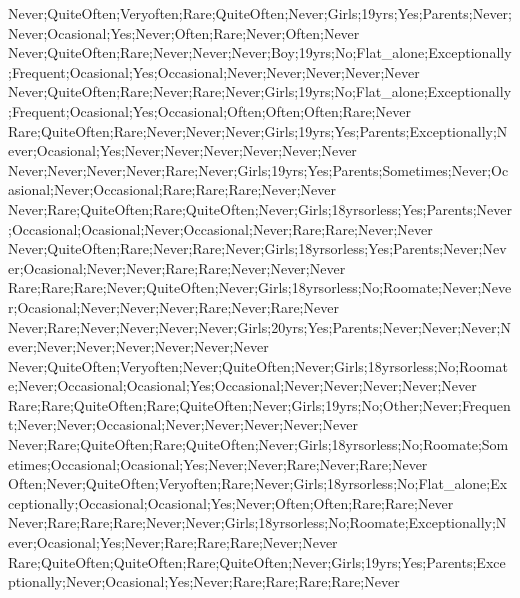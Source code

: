 Never;QuiteOften;Veryoften;Rare;QuiteOften;Never;Girls;19yrs;Yes;Parents;Never;Never;Ocasional;Yes;Never;Often;Rare;Never;Often;Never
Never;QuiteOften;Rare;Never;Never;Never;Boy;19yrs;No;Flat_alone;Exceptionally;Frequent;Ocasional;Yes;Occasional;Never;Never;Never;Never;Never
Never;QuiteOften;Rare;Never;Rare;Never;Girls;19yrs;No;Flat_alone;Exceptionally;Frequent;Ocasional;Yes;Occasional;Often;Often;Often;Rare;Never
Rare;QuiteOften;Rare;Never;Never;Never;Girls;19yrs;Yes;Parents;Exceptionally;Never;Ocasional;Yes;Never;Never;Never;Never;Never;Never
Never;Never;Never;Never;Rare;Never;Girls;19yrs;Yes;Parents;Sometimes;Never;Ocasional;Never;Occasional;Rare;Rare;Rare;Never;Never
Never;Rare;QuiteOften;Rare;QuiteOften;Never;Girls;18yrsorless;Yes;Parents;Never;Occasional;Ocasional;Never;Occasional;Never;Rare;Rare;Never;Never
Never;QuiteOften;Rare;Never;Rare;Never;Girls;18yrsorless;Yes;Parents;Never;Never;Ocasional;Never;Never;Rare;Rare;Never;Never;Never
Rare;Rare;Rare;Never;QuiteOften;Never;Girls;18yrsorless;No;Roomate;Never;Never;Ocasional;Never;Never;Never;Rare;Never;Rare;Never
Never;Rare;Never;Never;Never;Never;Girls;20yrs;Yes;Parents;Never;Never;Never;Never;Never;Never;Never;Never;Never;Never
Never;QuiteOften;Veryoften;Never;QuiteOften;Never;Girls;18yrsorless;No;Roomate;Never;Occasional;Ocasional;Yes;Occasional;Never;Never;Never;Never;Never
Rare;Rare;QuiteOften;Rare;QuiteOften;Never;Girls;19yrs;No;Other;Never;Frequent;Never;Never;Occasional;Never;Never;Never;Never;Never
Never;Rare;QuiteOften;Rare;QuiteOften;Never;Girls;18yrsorless;No;Roomate;Sometimes;Occasional;Ocasional;Yes;Never;Never;Rare;Never;Rare;Never
Often;Never;QuiteOften;Veryoften;Rare;Never;Girls;18yrsorless;No;Flat_alone;Exceptionally;Occasional;Ocasional;Yes;Never;Often;Often;Rare;Rare;Never
Never;Rare;Rare;Rare;Never;Never;Girls;18yrsorless;No;Roomate;Exceptionally;Never;Ocasional;Yes;Never;Rare;Rare;Rare;Never;Never
Rare;QuiteOften;QuiteOften;Rare;QuiteOften;Never;Girls;19yrs;Yes;Parents;Exceptionally;Never;Ocasional;Yes;Never;Rare;Rare;Rare;Rare;Never